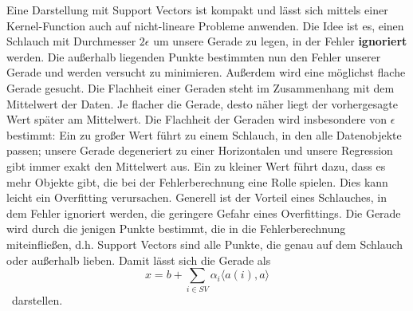 Eine Darstellung mit Support Vectors ist kompakt und lässt sich mittels
einer Kernel-Function auch auf nicht-lineare Probleme anwenden.
Die Idee ist es, einen Schlauch mit Durchmesser \(2\epsilon\) um
unsere Gerade zu legen, in der Fehler \textbf{ignoriert} werden.
Die außerhalb liegenden Punkte bestimmten nun den Fehler unserer Gerade
und werden versucht zu minimieren. Außerdem wird eine möglichst flache 
Gerade gesucht. Die Flachheit einer Geraden steht im Zusammenhang mit
dem Mittelwert der Daten. Je flacher die Gerade, desto näher liegt der
vorhergesagte Wert später am Mittelwert. Die Flachheit der Geraden 
wird insbesondere von \(\epsilon\) bestimmt: Ein zu großer Wert
führt zu einem Schlauch, in den alle Datenobjekte passen; unsere Gerade
degeneriert zu einer Horizontalen und unsere Regression gibt immer
exakt den Mittelwert aus. Ein zu kleiner Wert führt dazu, dass es mehr
Objekte gibt, die bei der Fehlerberechnung eine Rolle spielen. Dies kann
leicht ein Overfitting verursachen. Generell ist der Vorteil eines
Schlauches, in dem Fehler ignoriert werden, die geringere Gefahr eines
Overfittings. Die Gerade wird durch die jenigen Punkte bestimmt, die
in die Fehlerberechnung miteinfließen, d.h. Support Vectors sind alle
Punkte, die genau auf dem Schlauch oder außerhalb lieben.
Damit lässt sich die Gerade als
\[x = b + \sum _{i \in SV} \alpha_i \langle a(i),a\rangle\]\
darstellen.